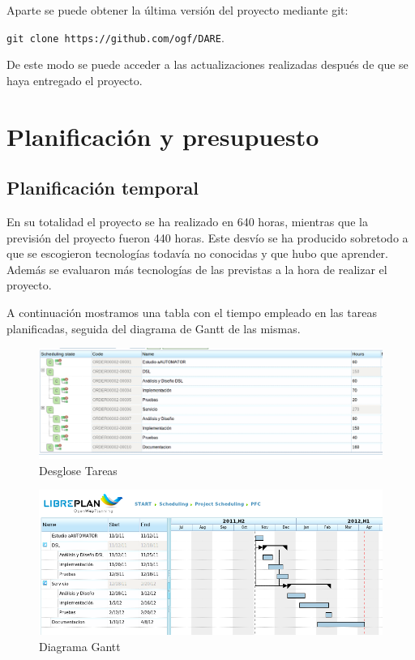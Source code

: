 Aparte se puede obtener la última versión del proyecto mediante git:

\verb+git clone https://github.com/ogf/DARE+.

De este modo se puede acceder a las actualizaciones realizadas después
de que se haya entregado el proyecto.

\section{Planificación y presupuesto}
\subsection{Planificación temporal}
En su totalidad el proyecto se ha realizado en 640 horas, mientras que
la previsión del proyecto fueron 440 horas. Este desvío se ha
producido sobretodo a que se escogieron tecnologías todavía no
conocidas y que hubo que aprender. Además se evaluaron más tecnologías
de las previstas a la hora de realizar el proyecto.

A continuación mostramos una tabla con el tiempo empleado en las
tareas planificadas, seguida del diagrama de Gantt de las mismas.

\begin{landscape}
  \begin{figure}[hbp]
    \begin{center}
      \includegraphics[width=1.4\textwidth]{tasks-structure.png}
    \end{center}
  \caption{Desglose Tareas}\label{tasks_structure}
  \end{figure}
\end{landscape}
\begin{landscape}
  \begin{figure}[hbp]
    \begin{center}
      \includegraphics[width=1.4\textwidth]{gantt-diagram.png}
    \end{center}
  \caption{Diagrama Gantt}\label{gantt_diagram}
  \end{figure}
\end{landscape}
